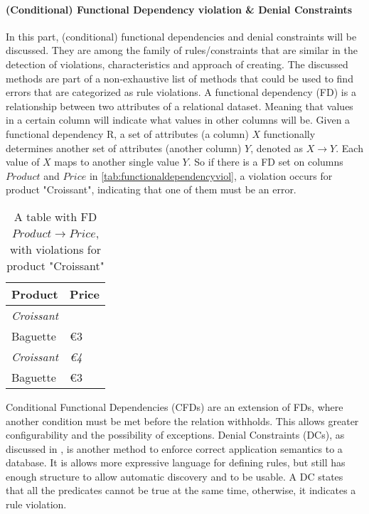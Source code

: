 \paragraph{(Conditional) Functional Dependency violation \& Denial Constraints}
In this part, (conditional) functional dependencies and denial constraints will be discussed. They are among the family of rules/constraints that are similar in the detection of violations, characteristics and approach of creating. The discussed methods are part of a non-exhaustive list of methods that could be used to find errors that are categorized as rule violations. 
A functional dependency (FD) is a relationship between two attributes of a relational dataset. Meaning that values in a certain column will indicate what values in other columns will be. Given a functional dependency R, a set of attributes (a column) $X$ functionally determines another set of attributes (another column) $Y$, denoted as $X \rightarrow Y$. Each value of $X$ maps to another single value $Y$. So if there is a FD set on columns $Product$ and $Price$ in \autoref{tab:functionaldependencyviol}, a violation occurs for product "Croissant", indicating that one of them must be an error.

\begin{table}[]
\centering
\begin{tabular}{ll}
\textbf{Product}   & \textbf{Price} \\ \hline
\textit{Croissant} & \textit{\texteuro 2}    \\
Baguette           & €3             \\
\textit{Croissant} & \textit{€4}    \\
Baguette           & €3            
\end{tabular}
\caption{A table with FD $Product \rightarrow Price$, with violations for product "Croissant"}
\label{tab:functionaldependencyviol}
\end{table}

Conditional Functional Dependencies (CFDs) are an extension of FDs, where another condition must be met before the relation withholds. This allows greater configurability and the possibility of exceptions. Denial Constraints (DCs), as discussed in \cite{Chu2013-qe}, is another method to enforce correct application semantics to a database. It is allows more expressive language for defining rules, but still has enough structure to allow automatic discovery and to be usable. A DC states that all the predicates cannot be true at the same time, otherwise, it indicates a rule violation.

